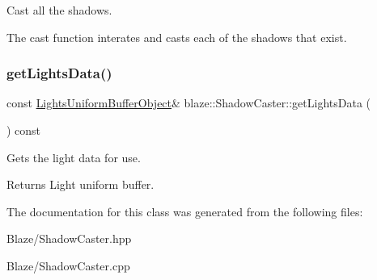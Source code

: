 Cast all the shadows. 

The cast function interates and casts each of the shadows that exist. \mbox{\label{classblaze_1_1ShadowCaster_aecb1af61dfeffe1a44a87b7f4aeeca98}} 
\subsubsection{\texorpdfstring{get\+Lights\+Data()}{getLightsData()}}
{\footnotesize\ttfamily const \hyperlink{structblaze_1_1LightsUniformBufferObject}{Lights\+Uniform\+Buffer\+Object}\& blaze\+::\+Shadow\+Caster\+::get\+Lights\+Data (\begin{DoxyParamCaption}{ }\end{DoxyParamCaption}) const\hspace{0.3cm}{\ttfamily [inline]}}



Get\textquotesingle{}s the light data for use. 

\begin{DoxyReturn}{Returns}
Light uniform buffer. 
\end{DoxyReturn}


The documentation for this class was generated from the following files\+:\begin{DoxyCompactItemize}
\item 
Blaze/Shadow\+Caster.\+hpp\item 
Blaze/Shadow\+Caster.\+cpp\end{DoxyCompactItemize}
